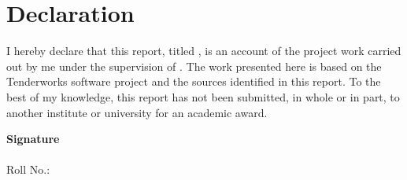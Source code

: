 \section*{Declaration}
I hereby declare that this report, titled \emph{\ttitle}, is an account of the project work carried out by me under the supervision of \supname. The work presented here is based on the Tenderworks software project and the sources identified in this report. To the best of my knowledge, this report has not been submitted, in whole or in part, to another institute or university for an academic award.

\vspace{2cm}
\begin{flushright}
\textbf{Signature}\\[0.4cm]
\authorname\\
Roll No.: \rn
\end{flushright}
\clearpage
